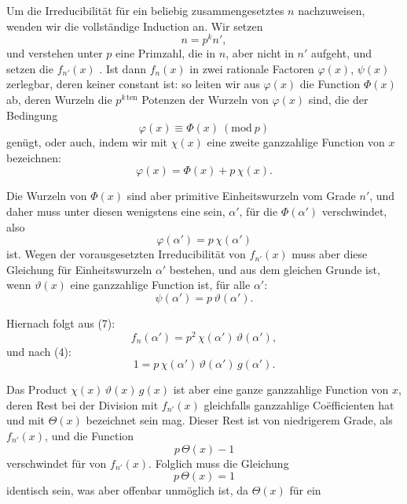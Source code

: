
Um die Irreducibilität für ein beliebig zusammengesetztes $n$
nachzuweisen, wenden wir die vollständige Induction an. Wir
setzen
\[
n = p^k n',
\]
und verstehen unter $p$ eine Primzahl, die in $n$, aber nicht in $n'$
aufgeht, und setzen die  $f_{n'}(x)$ . Ist dann $f_n(x)$ in zwei rationale Factoren
$\varphi(x)$, $\psi(x)$ zerlegbar, deren keiner constant ist:
so leiten wir aus $\varphi(x)$ die Function $\Phi(x)$ ab, deren Wurzeln
die $p^{k\,\mathrm{ten}}$ Potenzen der Wurzeln von $\varphi(x)$ sind, die der Bedingung
\[
\varphi(x) \equiv \Phi(x) \ (\mathrm{mod}\ p)
\]
genügt, oder auch, indem wir mit $\chi(x)$ eine zweite ganzzahlige
Function von $x$ bezeichnen:
\[
\varphi(x) = \Phi(x) + p\, \chi(x).
\]

Die Wurzeln von $\Phi(x)$ sind aber primitive Einheitswurzeln
vom Grade $n'$, und daher muss unter diesen wenigstens eine
sein, $\alpha'$, für die $\Phi(\alpha')$ verschwindet, also
\[
\varphi(\alpha') = p\, \chi(\alpha')
\]
ist. Wegen der vorausgesetzten Irreducibilität von $f_{n'}(x)$ muss
aber diese Gleichung für  Einheitswurzeln $\alpha'$ bestehen, und
aus dem gleichen Grunde ist, wenn $\vartheta(x)$ eine ganzzahlige
Function ist, für alle $\alpha'$:
\[
\psi(\alpha') = p\, \vartheta(\alpha').
\]

Hiernach folgt aus (7):
\[
f_n(\alpha') = p^2\, \chi(\alpha')\, \vartheta(\alpha'),
\]
und nach (4):
\[
1 = p\, \chi(\alpha')\, \vartheta(\alpha')\, g(\alpha').
\]

Das Product $\chi(x)\, \vartheta(x)\, g(x)$ ist aber eine ganze ganzzahlige
Function von $x$, deren Rest bei der Division mit $f_{n'}(x)$ gleichfalls ganzzahlige Coëfficienten hat und mit $\Theta(x)$ bezeichnet sein
mag. Dieser Rest ist von niedrigerem Grade, als $f_{n'}(x)$, und die
Function
\[
p\, \Theta(x) - 1
\]
verschwindet für  von $f_{n'}(x)$. Folglich muss die
Gleichung
\[
p\, \Theta(x) = 1
\]
identisch sein, was aber offenbar unmöglich ist, da $\Theta(x)$ für ein
